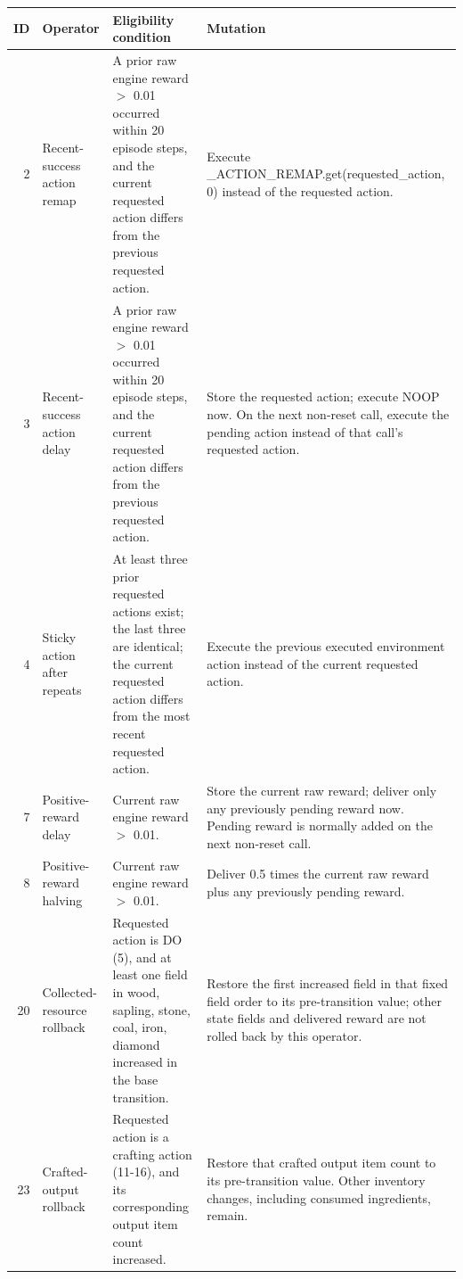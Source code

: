 \begin{table}[t]
\centering
\footnotesize
\setlength{\tabcolsep}{4pt}
\begin{tabularx}{\textwidth}{@{}r p{} >{\raggedright\arraybackslash}X >{\raggedright\arraybackslash}X@{}}
\toprule
ID & Operator & Eligibility condition & Mutation \\
\midrule
2 & Recent-success action remap & A prior raw engine reward \(>\) 0.01 occurred within 20 episode steps, and the current requested action differs from the previous requested action. & Execute \_ACTION\_REMAP.get(requested\_action, 0) instead of the requested action. \\
3 & Recent-success action delay & A prior raw engine reward \(>\) 0.01 occurred within 20 episode steps, and the current requested action differs from the previous requested action. & Store the requested action; execute NOOP now. On the next non-reset call, execute the pending action instead of that call's requested action. \\
4 & Sticky action after repeats & At least three prior requested actions exist; the last three are identical; the current requested action differs from the most recent requested action. & Execute the previous executed environment action instead of the current requested action. \\
7 & Positive-reward delay & Current raw engine reward \(>\) 0.01. & Store the current raw reward; deliver only any previously pending reward now. Pending reward is normally added on the next non-reset call. \\
8 & Positive-reward halving & Current raw engine reward \(>\) 0.01. & Deliver 0.5 times the current raw reward plus any previously pending reward. \\
20 & Collected-resource rollback & Requested action is DO (5), and at least one field in wood, sapling, stone, coal, iron, diamond increased in the base transition. & Restore the first increased field in that fixed field order to its pre-transition value; other state fields and delivered reward are not rolled back by this operator. \\
23 & Crafted-output rollback & Requested action is a crafting action (11-16), and its corresponding output item count increased. & Restore that crafted output item count to its pre-transition value. Other inventory changes, including consumed ingredients, remain. \\

\end{tabularx}
\end{table}
